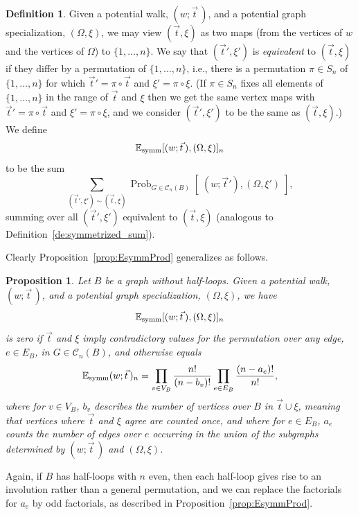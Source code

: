 \documentclass{memo-l}
\newcommand{\nonsigma}{\xi}
\theoremstyle{plain}
\newtheorem{proposition}[theorem]{Proposition}
\theoremstyle{definition}
\newtheorem{definition}[theorem]{Definition}
\numberwithin{section}{chapter}
\numberwithin{equation}{chapter}
\newcommand{\prob}[2]{{\Prob}_{#1}{\left[\; #2\; \right]}}
\DeclareMathOperator{\Prob}{Prob}
\newcommand{\potwalk}{(w;\vec t\,)}
\theoremstyle{plain}
\theoremstyle{definition}
\newcommand\EE{\mathbb{E}}
\newcommand\cC{\mathcal{C}}
\begin{document}
\begin{definition}
Given a potential
walk, \( \potwalk \), and a potential graph specialization,
$(\Omega,\nonsigma)$, we may view $(\vec t,\nonsigma)$ as two
maps (from the vertices of $w$ and the vertices of $\Omega$) to
$\{1,\ldots,n\}$.  We say that
$(\vec t',\nonsigma')$ is {\em equivalent} to
$(\vec t,\nonsigma)$ if they differ by a permutation
of $\{1,\ldots,n\}$, i.e., there is a permutation $\pi\in S_n$ 
of $\{1,\ldots,n\}$
for which $\vec t'=\pi\circ\vec t$ and $\nonsigma'=\pi\circ\nonsigma$.
(If $\pi\in S_n$ fixes all elements of $\{1,\ldots,n\}$ in the range
of $\vec t$ and $\nonsigma$ then we get the same vertex maps
with $\vec t'=\pi\circ\vec t$ and $\nonsigma'=\pi\circ\nonsigma$, and
we consider $(\vec t',\nonsigma')$ to be the same as
$(\vec t,\nonsigma)$.)
We define
$$
\EE_{\rm symm}[\potwalk,(\Omega,\nonsigma)]_n
$$
to be the sum
$$
\sum_{(\vec t',\nonsigma')\sim(\vec t,\nonsigma)}
\prob{G\in\cC_n(B)}{(w;\vec t'),(\Omega,\nonsigma')},
$$
summing over all $(\vec t',\nonsigma')$ equivalent to
$(\vec t,\nonsigma)$ (analogous to Definition~\ref{de:symmetrized_sum}).
\end{definition}

Clearly 
Proposition~\ref{prop:EsymmProd} generalizes as follows.
\begin{proposition}\label{pr:gen_EsymmProd}
Let $B$ be a graph without half-loops.
Given a potential
walk, \( \potwalk \), and a potential graph specialization,
$(\Omega,\nonsigma)$, we have
$$
\EE_{\rm symm}[\potwalk,(\Omega,\nonsigma)]_n
$$
is zero if $\vec t$ and $\nonsigma$ imply contradictory values for the
permutation over any edge, $e\in E_B$, in $G\in\cC_n(B)$, and otherwise
equals
\begin{equation}\label{eq:gen_walk_probability}
\EE_{\rm{symm}}\potwalk_n = \prod_{v \in V_B} \frac{n!}{(n-b_v)!} \prod_{e
\in E_B} \frac{(n-a_e)!}{n!},
\end{equation}
where for $v\in V_B$, $b_v$ describes the number of vertices over $B$
in $\vec t\cup\nonsigma$, meaning that vertices where $\vec t$ and 
$\nonsigma$ agree are counted once,
and where for $e\in E_B$, $a_e$ counts the number of edges over 
$e$ occurring
in the union of the subgraphs determined by
$\potwalk$ and $(\Omega,\nonsigma)$.
\end{proposition}
Again, if $B$ has half-loops with $n$ even, then each half-loop gives rise
to an involution rather than a general permutation, and we can replace
the factorials for $a_e$ by odd factorials, as described in
Proposition~\ref{prop:EsymmProd}.
\end{document}
